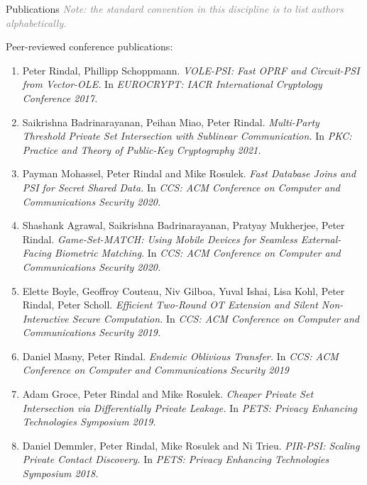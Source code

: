 \documentclass{resume} %
\begin{document}
\begin{rSection}{Publications}
\hfill {\scriptsize \textcolor{gray}{\emph{Note: the standard convention in this discipline is to list authors alphabetically.}}}

Peer-reviewed conference publications:
\begin{enumerate}[label=C\arabic* --]
	
	\item Peter Rindal,  Phillipp Schoppmann. \emph{VOLE-PSI: Fast OPRF and Circuit-PSI from Vector-OLE.} In \emph{EUROCRYPT: IACR International Cryptology Conference 2017.}
	
	\item Saikrishna Badrinarayanan, Peihan Miao, Peter Rindal. \emph{Multi-Party Threshold Private Set Intersection with Sublinear Communication.} In \emph{PKC: Practice and Theory of Public-Key Cryptography 2021.}
	
	\item Payman Mohassel, Peter Rindal and Mike Rosulek. \emph{Fast Database Joins and PSI for Secret Shared Data.} In \emph{CCS: ACM Conference on Computer and Communications Security 2020.}
	
	\item Shashank Agrawal, Saikrishna Badrinarayanan, Pratyay Mukherjee, Peter Rindal.
	\emph{Game-Set-MATCH: Using Mobile Devices for Seamless External-Facing Biometric Matching}. In \emph{CCS: ACM Conference on Computer and Communications Security  2020.}
	
	\item Elette Boyle, Geoffroy Couteau, Niv Gilboa, Yuval Ishai, Lisa Kohl, Peter Rindal, Peter Scholl.
	\emph{Efficient Two-Round OT Extension and Silent Non-Interactive Secure Computation.} In \emph{CCS: ACM Conference on Computer and Communications Security   2019.}
	
	\item Daniel Masny, Peter Rindal. \emph{Endemic Oblivious Transfer.} In \emph{CCS: ACM Conference on Computer and Communications Security 2019}
	
	\item Adam Groce, Peter Rindal and Mike Rosulek. \emph{Cheaper Private Set Intersection  via Differentially Private Leakage.}  In \emph{PETS: Privacy Enhancing Technologies Symposium 2019.}
	
	\item Daniel Demmler, Peter Rindal, Mike Rosulek and Ni Trieu. \emph{PIR-PSI: Scaling Private Contact Discovery.}  In \emph{PETS: Privacy Enhancing Technologies Symposium 2018.}
	

\end{enumerate}
\end{rSection}
\end{document}
